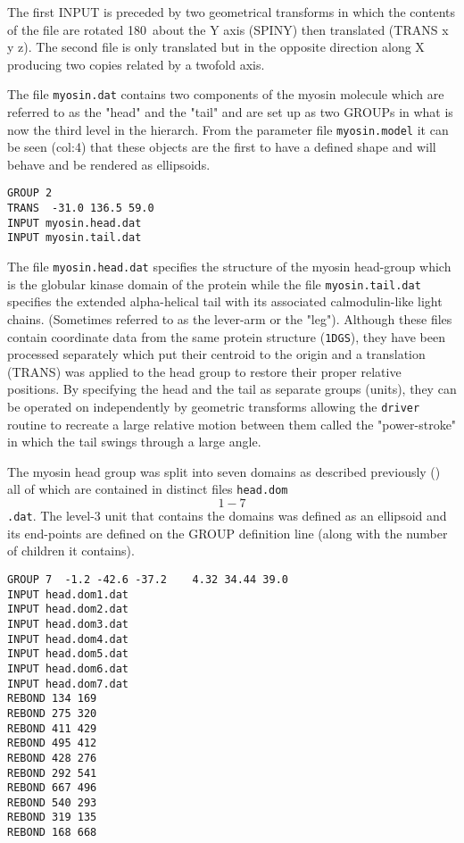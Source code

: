 The first INPUT is preceded by two geometrical transforms in which the contents
of the file are rotated 180\degr\ about the Y axis (SPINY) then translated 
(TRANS x y z).  The second file is only translated but in the opposite direction
along X producing two copies related by a twofold axis.

The file {\tt myosin.dat} contains two components of the myosin molecule which 
are referred to as the "head" and the "tail" and are set up as two GROUPs in what
is now the third level in the hierarch.   From the parameter file {\tt myosin.model}
it can be seen (col:4) that these objects are the first to have a defined shape
and will behave and be rendered as ellipsoids.

\begin{verbatim}
GROUP 2
TRANS  -31.0 136.5 59.0
INPUT myosin.head.dat
INPUT myosin.tail.dat
\end{verbatim}

The file {\tt myosin.head.dat} specifies the structure of the myosin head-group 
which is the globular kinase domain of the protein while the file {\tt myosin.tail.dat}
specifies the extended alpha-helical tail with its associated calmodulin-like
light chains. (Sometimes referred to as the lever-arm or the "leg").   Although these
files contain coordinate data from the same protein structure ({\tt 1DGS}), they have 
been processed separately which put their centroid to the origin and a translation
(TRANS) was applied to the head group to restore their proper relative positions.
By specifying the head and the tail as separate groups (units), they can be
operated on independently by geometric transforms allowing the {\tt driver} routine
to recreate a large relative motion between them called the "power-stroke" in which
the tail swings through a large angle.

The myosin head group was split into seven domains as described previously () all of
which are contained in distinct files {\tt head.dom\[1-7\].dat}.  The level-3 unit that
contains the domains was defined as an ellipsoid and its end-points are defined on the
GROUP definition line (along with the number of children it contains). 

\begin{verbatim}
GROUP 7  -1.2 -42.6 -37.2    4.32 34.44 39.0
INPUT head.dom1.dat
INPUT head.dom2.dat
INPUT head.dom3.dat
INPUT head.dom4.dat
INPUT head.dom5.dat
INPUT head.dom6.dat
INPUT head.dom7.dat
REBOND 134 169
REBOND 275 320
REBOND 411 429
REBOND 495 412
REBOND 428 276
REBOND 292 541
REBOND 667 496
REBOND 540 293
REBOND 319 135
REBOND 168 668
\end{verbatim}

